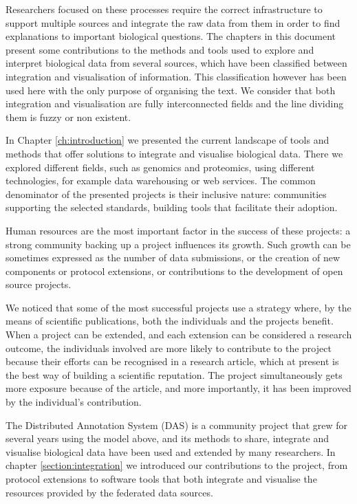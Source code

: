 Researchers focused on these processes require the correct infrastructure to support multiple sources and integrate the raw data from them in order to find explanations to important biological questions. The chapters in this document present some contributions to the methods and tools used to explore and interpret biological data from several sources, which have been classified between integration and visualisation of information. This classification however has been used here with the only purpose of organising the text. We consider that both integration and visualisation are fully interconnected fields and the line dividing them is fuzzy or non existent.

\vspace{5mm}

In Chapter \ref{ch:introduction} we presented the current landscape of tools and methods that offer solutions to integrate and visualise biological data. There we explored different fields, such as genomics and proteomics, using different technologies, for example data warehousing or web services. The common denominator of the presented projects is their inclusive nature: communities supporting the selected standards, building tools that facilitate their adoption. 

Human resources are the most important factor in the success of these projects: a strong community backing up a project influences its growth. Such growth can be sometimes expressed as the number of data submissions, or the creation of new components or protocol extensions, or contributions to the development of open source projects.

We noticed that some of the most successful projects use a strategy where, by the means of scientific publications, both the individuals and the projects  benefit. When a project can be extended, and each extension can be considered a research outcome, the individuals involved are more likely to contribute to the project because their efforts can be recognised in a research article, which at present is the best way of building a scientific reputation. The project simultaneously gets more exposure because of the article, and more importantly, it has been improved by the individual's contribution.

\vspace{5mm}

The Distributed Annotation System (DAS) is a community project that grew for several years using the model above, and its methods to share, integrate and visualise biological data have been used and extended by many researchers. In chapter \ref{section:integration} we introduced our contributions to the project, from protocol extensions to software tools that both integrate and visualise the resources provided by the federated data sources.

